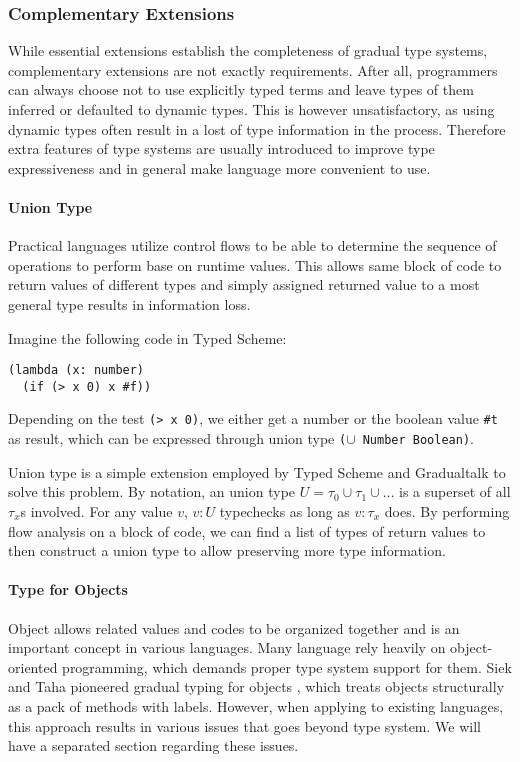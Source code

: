 \subsubsection{Complementary Extensions}

While essential extensions establish the completeness of gradual type systems,
complementary extensions are not exactly requirements.
After all, programmers can always choose not to use explicitly typed terms and
leave types of them inferred or defaulted to dynamic types.
This is however unsatisfactory, as using dynamic types often result in a lost of type information in the process.
Therefore extra features of type systems are usually introduced to improve type expressiveness and
in general make language more convenient to use.

\paragraph{Union Type}

Practical languages utilize control flows to be able to determine
the sequence of operations to perform base on runtime values.
This allows same block of code to return values of different types and simply
assigned returned value to a most general type results in information loss.

Imagine the following code in Typed Scheme:

\begin{verbatim}
(lambda (x: number)
  (if (> x 0) x #f))
\end{verbatim}

Depending on the test \texttt{(> x 0)}, we either get a number or the boolean value \texttt{\#t} as result,
which can be expressed through union type \texttt{($\cup$ Number Boolean)}.

Union type is a simple extension employed by Typed Scheme and Gradualtalk
to solve this problem.
By notation, an union type $U = \tau_0 \cup \tau_1 \cup \ldots$ is a superset of
all $\tau_x$s involved. For any value $v$, $v : U$ typechecks as long as $v : \tau_x$ does.
By performing flow analysis on a block of code, we can find a list of types of return values to
then construct a union type to allow preserving more type information.

\paragraph{Type for Objects}

Object allows related values and codes to be organized together and is an important concept
in various languages. Many language rely heavily on object-oriented programming,
which demands proper type system support for them.
Siek and Taha pioneered gradual typing for objects \cite{siek2007gradual}, which
treats objects structurally as a pack of methods with labels.
However, when applying to existing languages,
this approach results in various issues that goes beyond type system.
We will have a separated section regarding these issues.

